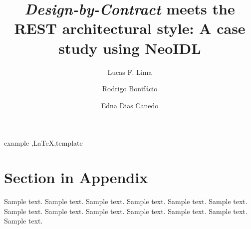 \documentclass[preprint,12pt,3p]{elsarticle}
\newcommand{\neoidl}{NeoIDL}
\newcommand{\designbycontract}{\textit{Design-by-Contract}}
\begin{document}
\begin{frontmatter}

\title{\designbycontract{} meets the REST architectural style:
A case study using \neoidl{}}


\author[label1,label2]{Lucas F. Lima}
\address[label1]{Brasilia, Brazil, Campus Darci Ribeiro}
\address[label2]{University of Brasilia - UnB}



\author[label5]{Rodrigo Bonifácio}
\address[label5]{University of Brasilia - UnB}

\author[label1,label5]{Edna Dias Canedo}

\begin{abstract}

\end{abstract}

\begin{keyword}
example \sep \LaTeX \sep template
\end{keyword}

\end{frontmatter}




 



 



\appendix

\section{Section in Appendix}
\label{appendix-sec1}

Sample text. Sample text. Sample text. Sample text. Sample text. Sample text. 
Sample text. Sample text. Sample text. Sample text. Sample text. Sample text. 
Sample text. 
\end{document}
